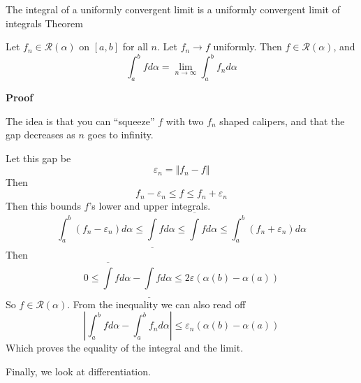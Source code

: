 \begin{result}
    {The integral of a uniformly convergent limit is a uniformly convergent limit of integrals}
    {Theorem}

    Let $f_n \in \mathscr{R}(\alpha)$ on $[a, b]$ for all $n$. Let $f_n \rightarrow f$ uniformly. Then $f \in \mathscr{R}(\alpha)$, and
    \[\int_a^b f d\alpha = \lim_{n \to \infty} \int_a^b f_n d\alpha\]

    \textbf{Proof}

    The idea is that you can ``squeeze'' $f$ with two $f_n$ shaped calipers, and that the gap decreases as $n$ goes to infinity.

    Let this gap be 
    \[\varepsilon_n = \Vert f_n - f\Vert\]
    Then
    \[f_n - \varepsilon_n \leq f \leq f_n + \varepsilon_n\]
    Then this bounds $f$'s lower and upper integrals.
    \[\int_a^b (f_n-\varepsilon_n) d\alpha \leq \underline{\int} f d\alpha \leq \overline{\int} f d\alpha \leq \int_a^b (f_n+\varepsilon_n) d\alpha\]
    Then
    \[0 \leq \overline{\int} f d\alpha - \underline{\int} fd\alpha \leq 2 \varepsilon(\alpha(b) - \alpha(a)) \]
    So $f \in \mathscr{R}(\alpha)$. From the inequality we can also read off 
    \[\left| \int_a^b fd\alpha - \int_a^b f_nd\alpha\right| \leq \varepsilon_n (\alpha(b) - \alpha(a))\]
    Which proves the equality of the integral and the limit.
\end{result}
    
Finally, we look at differentiation.

